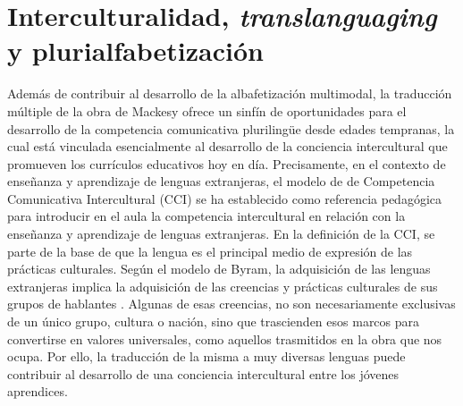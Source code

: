 \documentclass[spanish]{textolivre}
\begin{document}
\section{Interculturalidad, \textit{translanguaging} y plurialfabetización}\label{sec-modelo}
Además de contribuir al desarrollo de la albafetización multimodal, la traducción múltiple de la obra de Mackesy ofrece un sinfín de oportunidades para el desarrollo de la competencia comunicativa plurilingüe desde edades tempranas, la cual está vinculada esencialmente al desarrollo de la conciencia intercultural que promueven los currículos educativos hoy en día. Precisamente, en el contexto de enseñanza y aprendizaje de lenguas extranjeras, el modelo de \textcite{byram_teaching_1997} de Competencia Comunicativa Intercultural (CCI) se ha establecido como referencia pedagógica para introducir en el aula la competencia intercultural en relación con la enseñanza y aprendizaje de lenguas extranjeras. En la definición de la CCI, se parte de la base de que la lengua es el principal medio de expresión de las prácticas culturales. Según el modelo de Byram, la adquisición de las lenguas extranjeras implica la adquisición de las creencias y prácticas culturales de sus grupos de hablantes \cite{byram_teaching_2021}. Algunas de esas creencias, no son necesariamente exclusivas de un único grupo, cultura o nación, sino que trascienden esos marcos para convertirse en valores universales, como aquellos trasmitidos en la obra que nos ocupa. Por ello, la traducción de la misma a muy diversas lenguas puede contribuir al desarrollo de una conciencia intercultural entre los jóvenes aprendices.
\end{document}
